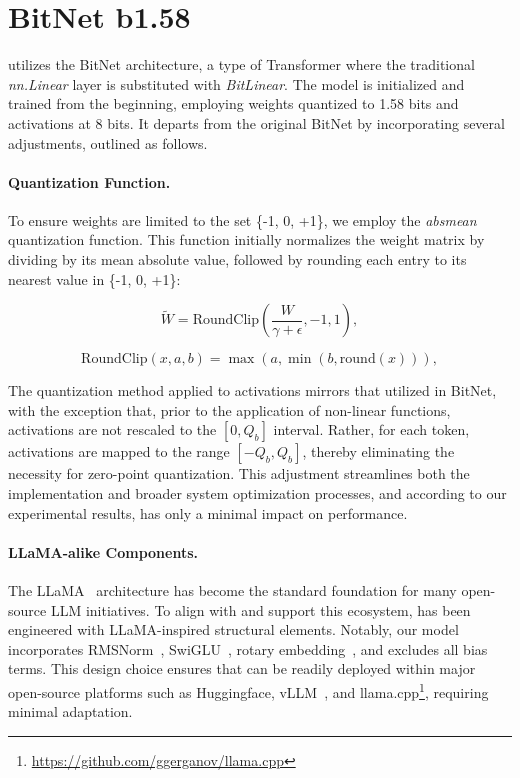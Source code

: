 \section{BitNet b1.58}

 utilizes the BitNet architecture, a type of Transformer where the traditional \emph{nn.Linear} layer is substituted with \emph{BitLinear}. The model is initialized and trained from the beginning, employing weights quantized to 1.58 bits and activations at 8 bits. It departs from the original BitNet by incorporating several adjustments, outlined as follows.

\paragraph{Quantization Function.} To ensure weights are limited to the set \{-1, 0, +1\}, we employ the \emph{absmean} quantization function. This function initially normalizes the weight matrix by dividing by its mean absolute value, followed by rounding each entry to its nearest value in \{-1, 0, +1\}:

\begin{equation}
    \widetilde{W} = \mathrm{RoundClip}(\frac{W}{\gamma + \epsilon}, -1, 1),
\end{equation}

\begin{equation}
    \mathrm{RoundClip}(x, a, b) = \max(a, \min(b, \mathrm{round}(x))),
\end{equation}

The quantization method applied to activations mirrors that utilized in BitNet, with the exception that, prior to the application of non-linear functions, activations are not rescaled to the $[0, Q_b]$ interval. Rather, for each token, activations are mapped to the range $[-Q_b, Q_b]$, thereby eliminating the necessity for zero-point quantization. This adjustment streamlines both the implementation and broader system optimization processes, and according to our experimental results, has only a minimal impact on performance.

\paragraph{LLaMA-alike Components.}

The LLaMA~\cite{llama, llama2} architecture has become the standard foundation for many open-source LLM initiatives. To align with and support this ecosystem,  has been engineered with LLaMA-inspired structural elements. Notably, our model incorporates RMSNorm~\cite{rmsnorm}, SwiGLU~\cite{swiglu}, rotary embedding~\cite{rope}, and excludes all bias terms. This design choice ensures that  can be readily deployed within major open-source platforms such as Huggingface, vLLM~\cite{vllm}, and llama.cpp\footnote{\url{https://github.com/ggerganov/llama.cpp}}, requiring minimal adaptation.

